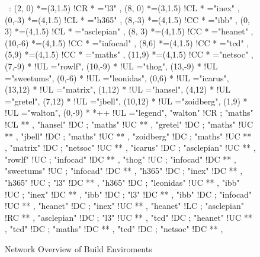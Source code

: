
\begin{figure}

\begin{center}

\ \xy<1cm,0cm>:
(2, 0)  	*=(3,1.5) !CR  						*\frm{-} ="l3" , 
(8, 0)  	*=(3,1.5) !CL  							*\frm{-} ="inex" , 
(0,-3) 	*=(4,1.5) !CL  					*\frm{-} ="h365" , 
(8,-3) 	*=(4,1.5) !CC  			*\frm{-} ="ibb" , 
(0, 3)  	*=(4,1.5) !CL  					*\frm{-} ="asclepian" , 
(8, 3)  	*=(4,1.5) !CC  						*\frm{-} ="heanet" , 
(10,-6)  *=(4,1.5) !CC  						*\frm{-} ="infocad" , 
(8,6)  	*=(4,1.5) !CC  			*\frm{-} ="tcd" , 
(5,9)  	*=(4,1.5) !CC  *\frm{-} ="maths" , 
(11,9)  	*=(4,1.5) !CC  						*\frm{-} ="netsoc" , 
%
\POS (7,-9) * !UL ="rowlf",
\POS (10,-9) * !UL ="thog",
\POS (13,-9) * !UL ="sweetums",
%
\POS (0,-6) * !UL ="leonidas",
%
\POS (0,6) * !UL ="icarus",
%
\POS (13,12) * !UL ="matrix",
%
\POS (1,12) * !UL ="hansel",
\POS (4,12) * !UL ="gretel",
\POS (7,12) * !UL ="jbell",
\POS (10,12) * !UL ="zoidberg",
\POS (1,9) * !UL ="walton",
%
\POS (0,-9) * *++\frm{-} !UL ="legend",
%
"walton" 	!CR ; "maths" 		!CL **\dir{=} ,
"hansel" 	!DC ; "maths" 		!UC **\dir{=} ,
"gretel" 	!DC ; "maths" 		!UC **\dir{=} ,
"jbell"  	!DC ; "maths" 		!UC **\dir{=} ,
"zoidberg"  !DC ; "maths" 		!UC **\dir{=} ,
%
"matrix"  	!DC ; "netsoc" 	!UC **\dir{-} ,
%
"icarus"  	!DC ; "asclepian" !UC **\dir{=} ,
%
"rowlf"  	!UC ; "infocad" 	!DC **\dir{=} ,
"thog"	  	!UC ; "infocad" 	!DC **\dir{=} ,
"sweetums" 	!UC ; "infocad" 	!DC **\dir{=} ,
%
"h365" 		!DC ; "inex" 		!DC **\dir{-} ,
"h365" 		!UC ; "l3" 			!DC **\dir{-} ,
"h365" 		!DC ; "leonidas" 	!UC **\dir{=} ,
%
"ibb" 		!UC ; "inex" 		!DC **\dir{-} ,
"ibb" 		!DC ; "l3" 			!DC **\dir{-} ,
"ibb" 		!DC ; "infocad" 	!UC **\dir{-} ,
%
"heanet" 	!DC ; "inex" 		!UC **\dir{=} ,
"heanet" 	!LC ; "asclepian" !RC **\dir{=} ,
%
"asclepian" !DC ; "l3" 			!UC **\dir{-} ,
%
"tcd" 		!DC ; "heanet" 	!UC **\dir{=} ,
"tcd" 		!DC ; "maths" 		!DC **\dir{=} ,
"tcd" 		!DC ; "netsoc" 	!DC **\dir{=} ,
\endxy

\end{center}

\caption{Network Overview of Build Enviroments}

\end{figure}
